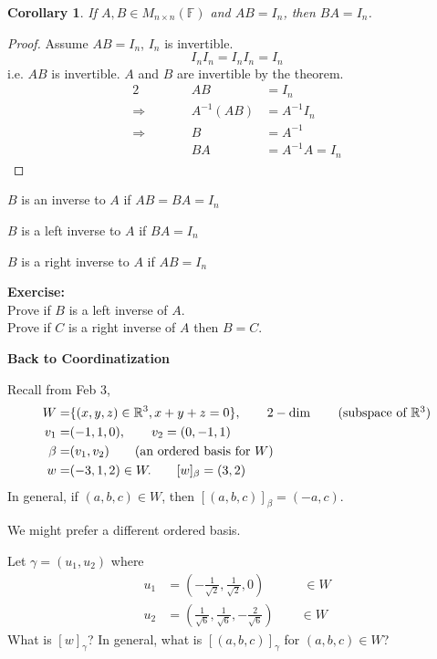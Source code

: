 \documentclass[12pt]{article}
\theoremstyle{plain}
\newtheorem{corollary}{Corollary}[subsection]
\newcommand{\mR}{{\mathbb{R}}}
\newcommand{\mF}{{\mathbb{F}}}
\begin{document}
	\begin{corollary}
		If $A,B \in M_{n\times n}(\mF)$ and $AB = I_n$, then $BA = I_n$. 
	\end{corollary}
	\begin{proof}
		Assume $AB = I_n$, $I_n$ is invertible. 
		\[
			I_nI_n = I_nI_n = I_n
		\]
		i.e. $AB$ is invertible. $A$ and $B$ are invertible by the theorem.
		\begin{alignat*}{2}
			& \qquad & AB &= I_n \\
			\Rightarrow & \qquad & A^{-1}(AB) &= A^{-1}I_n\\
			\Rightarrow & \qquad & B &= A^{-1} \\
						& &		BA &= A^{-1}A = I_n
		\end{alignat*}
	\end{proof}

	\begin{description}
		\item $B$ is an inverse to $A$ if $AB = BA = I_n$
		\item $B$ is a left inverse to $A$ if $BA = I_n$
		\item $B$ is a right inverse to $A$ if $AB = I_n$
	\end{description}

	\textbf{Exercise: }\\
	Prove if $B$ is a left inverse of $A$. \\ 
	Prove if $C$ is a right inverse of $A$ then $B = C$. 

	\textbf{Back to Coordinatization}
	
	Recall from Feb 3, 
	\begin{align*}
		W =& \{(x,y,z) \in \mR^3, x + y + z = 0\}, 
		\qquad 2-\dim \tag{subspace of $\mR^3$}\\
		v_1 =& (-1, 1, 0), \qquad v_2 = (0, -1, 1)\\
		\beta =& (v_1, v_2)		\tag{an ordered basis for $W$}\\
		w =& (-3, 1, 2) \in W. \qquad [w]_{\beta} = (3,2)
	\end{align*}
	In general, if $(a,b,c) \in W$, then $[(a,b,c)]_{\beta} = (-a, c)$. 

	We might prefer a different ordered basis.
	
	Let $\gamma = (u_1, u_2)$ where 
	\begin{align*}
		u_1 &= (-\frac1{\sqrt 2}, \frac1{\sqrt 2}, 0) 
		\qquad \quad \in W\\
		u_2 &= (\frac1{\sqrt 6}, \frac1{\sqrt 6}, -\frac{2}{\sqrt 6}) 
		\qquad \in W
	\end{align*}
	What is $[w]_{\gamma}$? 
	In general, what is $[(a,b,c)]_{\gamma}$ for $(a,b,c) \in W$? 
	
\end{document}
